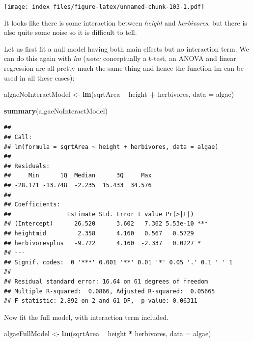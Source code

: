 \documentclass[]{article}
\newenvironment{Shaded}{\begin{snugshade}}{\end{snugshade}}
\newcommand{\DataTypeTok}[1]{\textcolor[rgb]{0.13,0.29,0.53}{#1}}
\newcommand{\KeywordTok}[1]{\textcolor[rgb]{0.13,0.29,0.53}{\textbf{#1}}}
\newcommand{\NormalTok}[1]{#1}
\newcommand{\OperatorTok}[1]{\textcolor[rgb]{0.81,0.36,0.00}{\textbf{#1}}}
\newcommand{\StringTok}[1]{\textcolor[rgb]{0.31,0.60,0.02}{#1}}
\begin{document}
\texttt{[image: index\_files/figure-latex/unnamed-chunk-103-1.pdf]}

It looks like there is some interaction between \emph{height} and
\emph{herbivores}, but there is also quite some noise so it is difficult
to tell.

Let us first fit a null model having both main effects but no
interaction term. We can do this again with \emph{lm} (\emph{note:}
conceptually a t-test, an ANOVA and linear regression are all pretty
much the same thing and hence the function lm can be used in all these
cases):

\begin{Shaded}
\begin{Highlighting}[]
\NormalTok{algaeNoInteractModel <-}\StringTok{ }\KeywordTok{lm}\NormalTok{(sqrtArea }\OperatorTok{~}\StringTok{ }\NormalTok{height }\OperatorTok{+}\StringTok{ }\NormalTok{herbivores, }\DataTypeTok{data =}\NormalTok{ algae)}

\KeywordTok{summary}\NormalTok{(algaeNoInteractModel)}
\end{Highlighting}
\end{Shaded}

\begin{verbatim}
## 
## Call:
## lm(formula = sqrtArea ~ height + herbivores, data = algae)
## 
## Residuals:
##     Min      1Q  Median      3Q     Max 
## -28.171 -13.748  -2.235  15.433  34.576 
## 
## Coefficients:
##                Estimate Std. Error t value Pr(>|t|)    
## (Intercept)      26.520      3.602   7.362 5.53e-10 ***
## heightmid         2.358      4.160   0.567   0.5729    
## herbivoresplus   -9.722      4.160  -2.337   0.0227 *  
## ---
## Signif. codes:  0 '***' 0.001 '**' 0.01 '*' 0.05 '.' 0.1 ' ' 1
## 
## Residual standard error: 16.64 on 61 degrees of freedom
## Multiple R-squared:  0.0866, Adjusted R-squared:  0.05665 
## F-statistic: 2.892 on 2 and 61 DF,  p-value: 0.06311
\end{verbatim}

Now fit the full model, with interaction term included.

\begin{Shaded}
\begin{Highlighting}[]
\NormalTok{algaeFullModel <-}\StringTok{ }\KeywordTok{lm}\NormalTok{(sqrtArea }\OperatorTok{~}\StringTok{ }\NormalTok{height }\OperatorTok{*}\StringTok{ }\NormalTok{herbivores, }\DataTypeTok{data =}\NormalTok{ algae)}
\end{Highlighting}
\end{Shaded}
\end{document}
